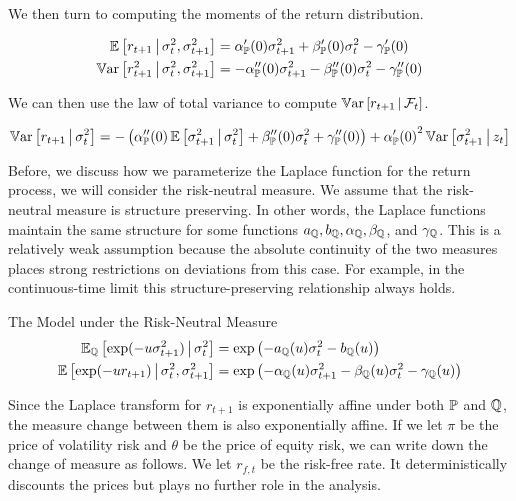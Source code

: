 \documentclass[11pt, letterpaper, twoside, final]{article}
\begin{document}
We then turn to computing the moments of the return distribution. 

\begin{align}
    \operatorname{\mathbb{E}}\left[r_{t+1} \,\middle\vert\, \sigma^2_t, \sigma^2_{t+1}\right]  &= \alpha_{\mathbb{P}}'(0) \sigma^2_{t+1}  + \beta_{\mathbb{P}}'(0)
    \sigma^2_t - \gamma_{\mathbb{P}}'(0) \\
    \operatorname{\mathbb{V}ar}\left[r_{t+1}^2 \,\middle\vert\, \sigma^2_t, \sigma^2_{t+1}\right]  &= -\alpha_{\mathbb{P}}''(0) \sigma^2_{t+1}  -
    \beta_{\mathbb{P}}''(0) \sigma^2_t - \gamma_{\mathbb{P}}''(0)
\end{align}

We can then use the law of total variance to compute $\operatorname{\mathbb{V}ar}\left[r_{t+1} \,\middle\vert\, \mathcal{F}_t\right]$.

\begin{equation}
    \operatorname{\mathbb{V}ar}\left[r_{t+1} \,\middle\vert\, \sigma^2_t\right]  = -\left( \alpha_{\mathbb{P}}''(0) \operatorname{\mathbb{E}} \left[\sigma^2_{t+1} \,\middle\vert\, \sigma^2_t \right]
    + \beta_{\mathbb{P}}''(0) \sigma^2_t + \gamma_{\mathbb{P}}''(0)\right) + {\alpha_{\mathbb{P}}'(0)}^2 \operatorname{\mathbb{V}ar}\left[\sigma^2_{t+1}
    \,\middle\vert\, z_{t} \right]
\end{equation}

Before, we discuss how we parameterize the Laplace function for the return process, we will consider the
risk-neutral measure.
We assume that the risk-neutral measure is structure preserving.
In other words, the Laplace functions maintain the same structure for some functions $a_{\mathbb{Q}}, b_{\mathbb{Q}},
\alpha_{\mathbb{Q}}, \beta_{\mathbb{Q}}$, and $\gamma_{\mathbb{Q}}$.
This is a relatively weak assumption because the absolute continuity of the two measures places strong
restrictions on deviations from this case.
For example, in the continuous-time limit this structure-preserving relationship always holds.

\begin{defn}{The Model under the Risk-Neutral Measure}
    \label{defn:risk_neutral_model}
    \begin{align}
        \operatorname{\mathbb{E}}_{\mathbb{Q}} \left[\exp(-u \sigma^2_{t+1}) \,\middle\vert\, \sigma^2_t\right] &= \exp\left( - a_{\mathbb{Q}}(u)
            \sigma^2_{t} - b_{\mathbb{Q}}(u) \right) \\
        \operatorname{\mathbb{E}}\left[\exp(-u r_{t+1}) \,\middle\vert\, \sigma^2_{t},  \sigma^2_{t+1}\right] &= \exp\left(- \alpha_{\mathbb{Q}}(u)
        \sigma^2_{t+1} - \beta_{\mathbb{Q}}(u)\sigma^2_{t} - \gamma_{\mathbb{Q}}(u) \right) 
    \end{align}
\end{defn}

Since the Laplace transform for $r_{t+1}$  is exponentially affine under both $\mathbb{P}$ and $\mathbb{Q}$, the measure change
between them is also exponentially affine.
If we let $\pi$ be the price of volatility risk and $\theta$ be the price of equity risk, we can write down the
change of measure as follows.
We let $r_{f,t}$ be the risk-free rate.
It deterministically discounts the prices but plays no further role in the analysis.
\end{document}
